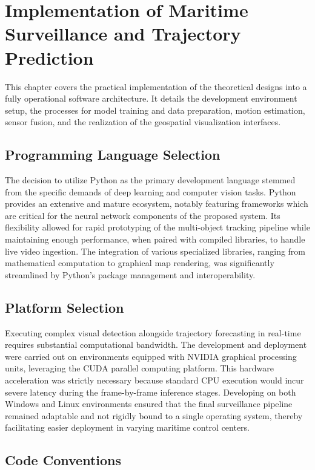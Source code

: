 \chapter{Implementation of Maritime Surveillance and Trajectory Prediction}

This chapter covers the practical implementation of the theoretical designs into a fully operational software architecture. It details the development environment setup, the processes for model training and data preparation, motion estimation, sensor fusion, and the realization of the geospatial visualization interfaces.

\section{Programming Language Selection}

The decision to utilize Python as the primary development language stemmed from the specific demands of deep learning and computer vision tasks. Python provides an extensive and mature ecosystem, notably featuring frameworks which are critical for the neural network components of the proposed system. Its flexibility allowed for rapid prototyping of the multi-object tracking pipeline while maintaining enough performance, when paired with compiled libraries, to handle live video ingestion. The integration of various specialized libraries, ranging from mathematical computation to graphical map rendering, was significantly streamlined by Python's package management and interoperability.

\section{Platform Selection}

Executing complex visual detection alongside trajectory forecasting in real-time requires substantial computational bandwidth. The development and deployment were carried out on environments equipped with NVIDIA graphical processing units, leveraging the CUDA parallel computing platform. This hardware acceleration was strictly necessary because standard CPU execution would incur severe latency during the frame-by-frame inference stages. Developing on both Windows and Linux environments ensured that the final surveillance pipeline remained adaptable and not rigidly bound to a single operating system, thereby facilitating easier deployment in varying maritime control centers.

\section{Code Conventions}

